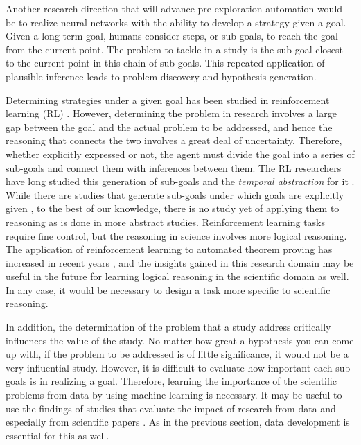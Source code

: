 \documentclass{article}
\begin{document}
Another research direction that will advance pre-exploration automation would be to realize neural networks with the ability to develop a strategy given a goal. Given a long-term goal, humans consider steps, or sub-goals, to reach the goal from the current point. The problem to tackle in a study is the sub-goal closest to the current point in this chain of sub-goals. This repeated application of plausible inference leads to problem discovery and hypothesis generation.

Determining strategies under a given goal has been studied in reinforcement learning (RL) \cite{kaelbling1993learning,schaul2015universal,liu2022goal}. However, determining the problem in research involves a large gap between the goal and the actual problem to be addressed, and hence the reasoning that connects the two involves a great deal of uncertainty. Therefore, whether explicitly expressed or not, the agent must divide the goal into a series of sub-goals and connect them with inferences between them. The RL researchers have long studied this generation of sub-goals and the \textit{temporal abstraction} for it \cite{sutton1999between,precup2000temporal,dayan1992feudal,schmidhuber1991neural,vezhnevets2017feudal}. While there are studies that generate sub-goals under which goals are explicitly given \cite{chane2021goal}, to the best of our knowledge, there is no study yet of applying them to reasoning as is done in more abstract studies. Reinforcement learning tasks require fine control, but the reasoning in science involves more logical reasoning. The application of reinforcement learning to automated theorem proving has increased in recent years \cite{szegedy2020promising}, and the insights gained in this research domain may be useful in the future for learning logical reasoning in the scientific domain as well. In any case, it would be necessary to design a task more specific to scientific reasoning.

In addition, the determination of the problem that a study address critically influences the value of the study. No matter how great a hypothesis you can come up with, if the problem to be addressed is of little significance, it would not be a very influential study. However, it is difficult to evaluate how important each sub-goals is in realizing a goal. Therefore, learning the importance of the scientific problems from data by using machine learning is necessary. It may be useful to use the findings of studies that evaluate the impact of research from data \cite{wang2021} and especially from scientific papers \cite{savov2020identifying}. As in the previous section, data development is essential for this as well.
\end{document}
